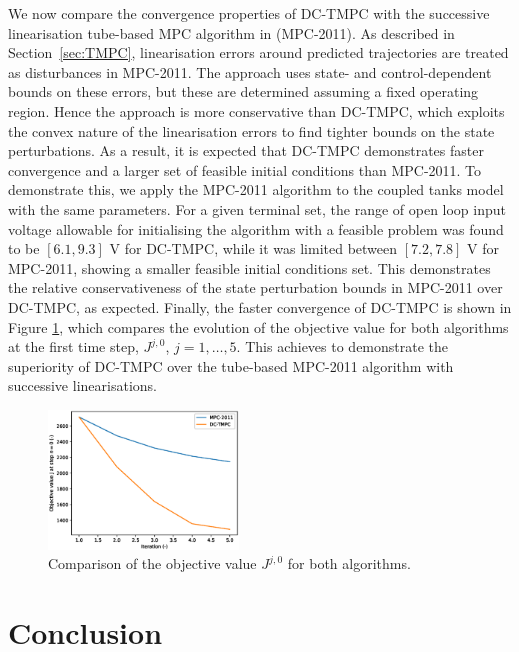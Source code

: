 \documentclass[a4paper, 10 pt, conference]{IEEEconf}
\begin{document}
We now compare the convergence properties of DC-TMPC with the successive linearisation tube-based MPC algorithm in \cite{mark} (MPC-2011). As described in Section~\ref{sec:TMPC}, linearisation errors around predicted trajectories are treated as disturbances in MPC-2011. The approach uses state- and control-dependent bounds on these errors, but these are determined assuming a fixed operating region. Hence the approach is more conservative than DC-TMPC, which exploits the convex nature of the linearisation errors to find tighter bounds on the state perturbations. As a result, it is expected that DC-TMPC demonstrates faster convergence and a larger set of feasible initial conditions than MPC-2011. To demonstrate this, we apply the MPC-2011 algorithm to the coupled tanks model with the same parameters. 
For a given terminal set, the range of open loop input voltage allowable for initialising the algorithm with a feasible problem was found to be $[6.1, 9.3]$ V for DC-TMPC, while it was limited between $[7.2, 7.8]$ V for MPC-2011, showing a smaller feasible initial conditions set. This demonstrates the relative conservativeness of the state perturbation bounds in MPC-2011 over DC-TMPC, as expected. Finally, the faster convergence of DC-TMPC is shown in Figure \ref{fig:tmpc5}, which compares the evolution of the objective value for both algorithms at the first time step, $J^{j,0}$, $j=1,\ldots,5$. This achieves to demonstrate the superiority of DC-TMPC over the tube-based MPC-2011 algorithm with successive linearisations.  

\begin{figure}[h]
    \centering
    \includegraphics[width=0.45\textwidth]{img/tmpc5.eps} %
    \caption{Comparison of the objective value $J^{j,0}$ for both algorithms.}
    \label{fig:tmpc5}
\end{figure}

\section{Conclusion}
\label{sec:conclusion}
\end{document}
